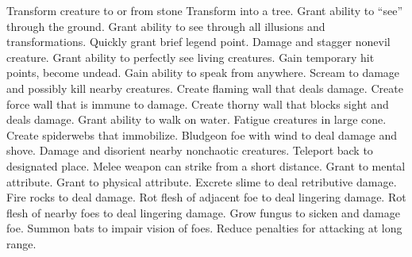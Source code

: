     {Transform creature to or from stone}
    {Transform into a tree.}
    {Grant ability to ``see'' through the ground.}
    {Grant ability to see through all illusions and transformations.}
    {Quickly grant brief legend point.}
    {Damage and stagger nonevil creature.}
    {Grant ability to perfectly see living creatures.}
    {Gain temporary hit points, become undead.}
    {Gain ability to speak from anywhere.}
    {Scream to damage and possibly kill nearby creatures.}
    {Create flaming wall that deals damage.}
    {Create force wall that is immune to damage.}
    {Create thorny wall that blocks sight and deals damage.}
    {Grant ability to walk on water.}
    {Fatigue creatures in large cone.}
    {Create spiderwebs that immobilize.}
    {Bludgeon foe with wind to deal damage and shove.}
    {Damage and disorient nearby nonchaotic creatures.}
    {Teleport back to designated place.}
    {Melee weapon can strike from a short distance.}
    {Grant  to mental attribute.}
    {Grant  to physical attribute.}
    {Excrete slime to deal retributive damage.}
    {Fire rocks to deal damage.}
    {Rot flesh of adjacent foe to deal lingering damage.}
    {Rot flesh of nearby foes to deal lingering damage.}
    {Grow fungus to sicken and damage foe.}
    {Summon bats to impair vision of foes.}
    {Reduce penalties for attacking at long range.}
